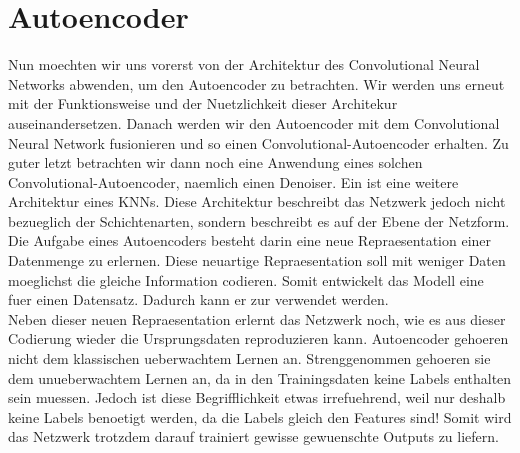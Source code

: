 \chapter{Autoencoder}\label{sec:autoencoder}
Nun moechten wir uns vorerst von der Architektur des Convolutional Neural
Networks abwenden, um den Autoencoder zu betrachten. Wir werden uns erneut
mit der Funktionsweise und der Nuetzlichkeit dieser Architekur
auseinandersetzen. Danach werden wir den Autoencoder mit dem Convolutional
Neural Network fusionieren und so einen Convolutional-Autoencoder erhalten. Zu
guter letzt betrachten wir dann noch eine Anwendung eines solchen
Convolutional-Autoencoder, naemlich einen Denoiser.
\para{}
\bigskip
Ein  ist eine weitere Architektur eines KNNs. Diese Architektur
beschreibt das Netzwerk jedoch nicht bezueglich der Schichtenarten, sondern beschreibt es
auf der Ebene der Netzform. \\
Die Aufgabe eines Autoencoders besteht darin eine neue Repraesentation einer Datenmenge
zu erlernen. Diese neuartige Repraesentation soll mit weniger Daten moeglichst die gleiche
Information codieren. Somit entwickelt das Modell eine  fuer einen Datensatz. Dadurch kann er zur
 verwendet werden. \\
Neben dieser neuen Repraesentation erlernt das Netzwerk noch, wie es
aus dieser Codierung wieder die Ursprungsdaten reproduzieren kann.
\para{}
Autoencoder gehoeren nicht dem klassischen ueberwachtem Lernen an. Strenggenommen gehoeren
sie dem unueberwachtem Lernen an, da in den Trainingsdaten keine Labels
enthalten sein muessen. Jedoch ist diese Begrifflichkeit etwas irrefuehrend,
weil nur deshalb keine Labels benoetigt werden, da die Labels gleich den Features sind!
Somit wird das Netzwerk trotzdem darauf trainiert gewisse gewuenschte Outputs
zu liefern.

\cite{book:autoencoder}

